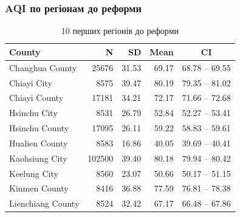 \documentclass{beamer}
\begin{document}
\begin{frame}
  \frametitle{AQI по регіонам до реформи}

  \begin{table}[ht]
    \centering
    \begin{tabular}{lrrrc}
      \hline
      County            & N      & SD    & Mean  & CI \\ 
      \hline
      Changhua County   & 25676  & 31.53 & 69.17 & 68.78 -- 69.55 \\ 
      Chiayi City       & 8575   & 39.47 & 80.19 & 79.35 -- 81.02 \\ 
      Chiayi County     & 17181  & 34.21 & 72.17 & 71.66 -- 72.68 \\ 
      Hsinchu City      & 8531   & 26.79 & 52.84 & 52.27 -- 53.41 \\ 
      Hsinchu County    & 17095  & 26.11 & 59.22 & 58.83 -- 59.61 \\ 
      Hualien County    & 8583   & 16.86 & 40.05 & 39.69 -- 40.41 \\ 
      Kaohsiung City    & 102500 & 39.40 & 80.18 & 79.94 -- 80.42 \\ 
      Keelung City      & 8560   & 23.07 & 50.66 & 50.17 -- 51.15 \\ 
      Kinmen County     & 8416   & 36.88 & 77.59 & 76.81 -- 78.38 \\ 
      Lienchiang County & 8524   & 32.42 & 67.17 & 66.48 -- 67.86 \\ 
      \hline
    \end{tabular}
    \caption{10 перших регіонів до реформи} 
    \end{table}
      
\end{frame}
\end{document}
